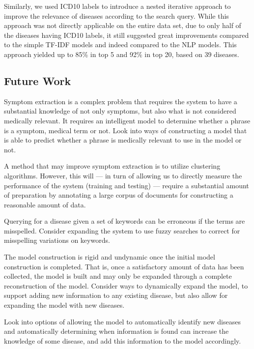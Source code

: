 \documentclass[10pt,letterpaper,final]{article}
\begin{document}
Similarly, we used ICD10 labels to introduce a nested iterative approach
to improve the relevance of diseases according to the search query.
While this approach was not directly applicable on the entire data set,
due to only half of the diseases having ICD10 labels, it still suggested
great improvements compared to the simple TF-IDF models and indeed
compared to the NLP models. This approach yielded up to 85\% in top 5
and 92\% in top 20, based on 39 diseases.



\subsection{Future Work}
Symptom extraction is a complex problem that requires the system to have
a substantial knowledge of not only symptoms, but also what is not
considered medically relevant. It requires an intelligent model to
determine whether a phrase is a symptom, medical term or not. Look into
ways of constructing a model that is able to predict whether a phrase
is medically relevant to use in the model or not.

A method that may improve symptom extraction is to utilize clustering
algorithms. However, this will --- in turn of allowing us to directly measure the
performance of the system (training and testing) --- require a substantial
amount of preparation by annotating a large corpus of documents for
constructing a reasonable amount of data.

Querying for a disease given a set of keywords can be erroneous if the
terms are misspelled. Consider expanding the system to use fuzzy
searches to correct for misspelling variations on keywords.

The model construction is rigid and undynamic once the initial model
construction is completed. That is, once a satisfactory amount of data
has been collected, the model is built and may only be expanded through
a complete reconstruction of the model. Consider ways to dynamically
expand the model, to support adding new information to any existing
disease, but also allow for expanding the model with new diseases.

Look into options of allowing the model to automatically identify new
diseases and automatically determining when information is found can
increase the knowledge of some disease, and add this information to the
model accordingly.
\end{document}
